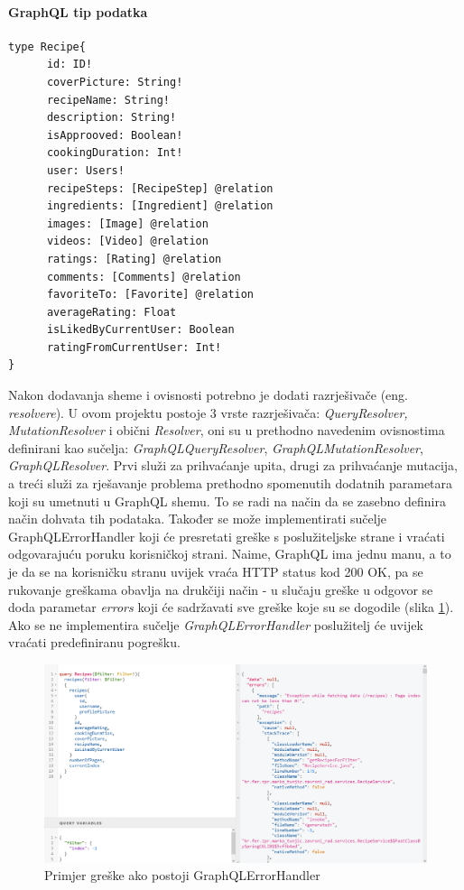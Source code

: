\documentclass[times, utf8, zavrsni]{fer}
\begin{document}
\paragraph{GraphQL tip podatka}
\label{graphqlType}
\begin{Verbatim}[fontsize=\scriptsize]
type Recipe{
      id: ID!
      coverPicture: String!
      recipeName: String!
      description: String!
      isApprooved: Boolean!
      cookingDuration: Int!
      user: Users!
      recipeSteps: [RecipeStep] @relation
      ingredients: [Ingredient] @relation
      images: [Image] @relation
      videos: [Video] @relation
      ratings: [Rating] @relation
      comments: [Comments] @relation
      favoriteTo: [Favorite] @relation
      averageRating: Float
      isLikedByCurrentUser: Boolean
      ratingFromCurrentUser: Int!
}
\end{Verbatim}
Nakon dodavanja sheme i ovisnosti potrebno je dodati razrješivače (eng. \textit{resolvere}). U ovom projektu postoje 3 vrste razrješivača:
\textit{QueryResolver, MutationResolver} i obični \textit{Resolver}, oni su u prethodno navedenim ovisnostima definirani kao sučelja:
\textit{GraphQLQueryResolver}, \textit{GraphQLMutationResolver}, \textit{GraphQLResolver}. Prvi služi za prihvaćanje upita, drugi za prihvaćanje
mutacija, a treći služi za rješavanje problema prethodno spomenutih dodatnih parametara koji su umetnuti u GraphQL shemu. To se radi
na način da se zasebno definira način dohvata tih podataka. Također se može implementirati sučelje GraphQLErrorHandler koji
će presretati greške s poslužiteljske strane i vraćati odgovarajuću poruku korisničkoj strani. Naime, GraphQL
ima jednu manu, a to je da se na korisničku stranu uvijek vraća HTTP status kod 200 OK, pa se rukovanje greškama
obavlja na drukčiji način - u slučaju greške u odgovor se doda parametar \textit{errors} koji će sadržavati
sve greške koje su se dogodile (slika \ref{fig:Handled error}).
Ako se ne implementira sučelje \textit{GraphQLErrorHandler} poslužitelj će uvijek vraćati predefiniranu pogrešku. \\
\begin{figure}[h]
      \includegraphics[width=\textwidth]{graphql_handled_error.png}
      \caption{Primjer greške ako postoji GraphQLErrorHandler}
      \label{fig:Handled error}
\end{figure}
\end{document}
